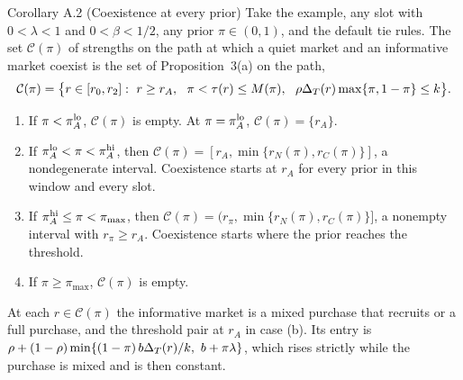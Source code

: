 \begin{paperresult}{Corollary A.2 (Coexistence at every prior)}
Take the example, any slot with \(0<\lambda<1\) and \(0<\beta<1/2\), any prior \(\pi\in(0,1)\), and the default tie
rules. The set \(\mathcal C(\pi)\) of strengths on the path at which a quiet market and an informative market coexist
is the set of Proposition~3(a) on the path,
\[
\mathcal C(\pi)=\bigl\{r\in[r_0,r_2]:\ r\ge r_A,\ \ \pi<\tau(r)\le M(\pi),\ \ \rho\DT(r)\max\{\pi,1-\pi\}\le k\bigr\}.
\]
\begin{enumerate}[label=(\alph*),leftmargin=2em]
\item If \(\pi<\pi_A^{\rm lo}\), \(\mathcal C(\pi)\) is empty. At \(\pi=\pi_A^{\rm lo}\), \(\mathcal C(\pi)=\{r_A\}\).
\item If \(\pi_A^{\rm lo}<\pi<\pi_A^{\rm hi}\), then \(\mathcal C(\pi)=[r_A,\min\{r_N(\pi),r_C(\pi)\}]\), a nondegenerate
interval. Coexistence starts at \(r_A\) for every prior in this window and every slot.
\item If \(\pi_A^{\rm hi}\le\pi<\pi_{\max}\), then \(\mathcal C(\pi)=(r_\pi,\min\{r_N(\pi),r_C(\pi)\}]\), a nonempty
interval with \(r_\pi\ge r_A\). Coexistence starts where the prior reaches the threshold.
\item If \(\pi\ge\pi_{\max}\), \(\mathcal C(\pi)\) is empty.
\end{enumerate}
At each \(r\in\mathcal C(\pi)\) the informative market is a mixed purchase that recruits or a full purchase, and the
threshold pair at \(r_A\) in case (b). Its entry is \(\rho+(1-\rho)\min\{(1-\pi)\,b\DT(r)/k,\ b+\pi\lambda\}\), which
rises strictly while the purchase is mixed and is then constant.
\end{paperresult}

